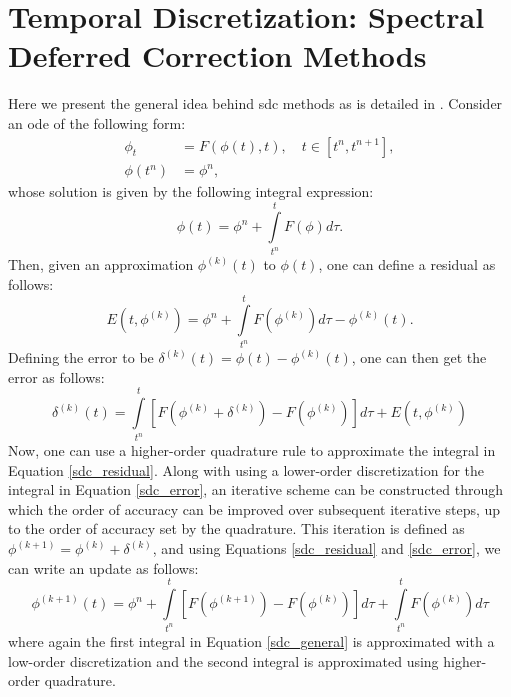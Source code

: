 \section{Temporal Discretization: Spectral Deferred Correction Methods}
Here we present the general idea behind \gls{sdc} methods as is detailed in \cite{MISDC_general}. Consider an \gls{ode} of the following form: 
\begin{equation} \label{toy_ode}
\begin{split}
\phi_t &= F(\phi(t), t), \quad t \in [t^n, t^{n+1}], \\
\phi(t^n) &= \phi^n, 
\end{split}
\end{equation}
whose solution is given by the following integral expression:
\begin{equation}
\phi(t) = \phi^n + \int\limits_{t^n}^{t} F(\phi) d\tau.
\end{equation}
Then, given an approximation $\phi^{(k)}(t)$ to $\phi(t)$, one can define a residual as follows:
\begin{equation} \label{sdc_residual}
E(t, \phi^{(k)}) = \phi^n + \int\limits_{t^n}^t  F(\phi^{(k)}) d\tau - \phi^{(k)}(t).
\end{equation}
Defining the error to be $\delta^{(k)}(t) = \phi(t) - \phi^{(k)}(t)$, one can then get the error as follows:
\begin{equation} \label{sdc_error}
\delta^{(k)}(t) = \int\limits_{t^n}^{t} \left[ F(\phi^{(k)} + \delta^{(k)}) - F(\phi^{(k)}) \right] d\tau + E(t, \phi^{(k)})
\end{equation}
Now, one can use a higher-order quadrature rule to approximate the integral in Equation \eqref{sdc_residual}. Along with using a lower-order discretization for the integral in Equation \eqref{sdc_error}, an iterative scheme can be constructed through which the order of accuracy can be improved over subsequent iterative steps, up to the order of accuracy set by the quadrature. This iteration is defined as $\phi^{(k+1)} = \phi^{(k)} + \delta^{(k)}$, and using Equations \eqref{sdc_residual} and \eqref{sdc_error}, we can write an update as follows:
\begin{equation} \label{sdc_general}
\phi^{(k+1)}(t) = \phi^n + \int\limits_{t^n}^{t} \left[ F(\phi^{(k+1)}) - F(\phi^{(k)}) \right] d\tau + \int\limits_{t^n}^{t}F(\phi^{(k)}) d\tau
\end{equation}
where again the first integral in Equation \eqref{sdc_general} is approximated with a low-order discretization and the second integral is approximated using higher-order quadrature.

